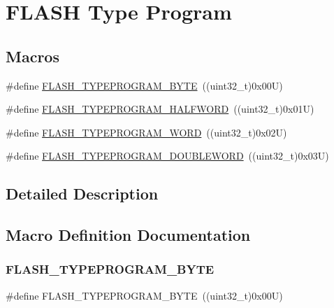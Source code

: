 \hypertarget{group___f_l_a_s_h___type___program}{}\section{F\+L\+A\+SH Type Program}
\label{group___f_l_a_s_h___type___program}
\subsection*{Macros}
\begin{DoxyCompactItemize}
\item 
\#define \mbox{\hyperlink{group___f_l_a_s_h___type___program_gac975d7139325057ed0069c6b55e4faed}{F\+L\+A\+S\+H\+\_\+\+T\+Y\+P\+E\+P\+R\+O\+G\+R\+A\+M\+\_\+\+B\+Y\+TE}}~((uint32\+\_\+t)0x00\+U)
\item 
\#define \mbox{\hyperlink{group___f_l_a_s_h___type___program_ga2b607dfc2efd463a8530e327bc755582}{F\+L\+A\+S\+H\+\_\+\+T\+Y\+P\+E\+P\+R\+O\+G\+R\+A\+M\+\_\+\+H\+A\+L\+F\+W\+O\+RD}}~((uint32\+\_\+t)0x01\+U)
\item 
\#define \mbox{\hyperlink{group___f_l_a_s_h___type___program_gadd25c6821539030ba6711e7c0d586c3e}{F\+L\+A\+S\+H\+\_\+\+T\+Y\+P\+E\+P\+R\+O\+G\+R\+A\+M\+\_\+\+W\+O\+RD}}~((uint32\+\_\+t)0x02\+U)
\item 
\#define \mbox{\hyperlink{group___f_l_a_s_h___type___program_gabdc2b0b4d2e66c2be90fafbfbf1e225f}{F\+L\+A\+S\+H\+\_\+\+T\+Y\+P\+E\+P\+R\+O\+G\+R\+A\+M\+\_\+\+D\+O\+U\+B\+L\+E\+W\+O\+RD}}~((uint32\+\_\+t)0x03\+U)
\end{DoxyCompactItemize}


\subsection{Detailed Description}


\subsection{Macro Definition Documentation}
\mbox{\label{group___f_l_a_s_h___type___program_gac975d7139325057ed0069c6b55e4faed}} 
\subsubsection{\texorpdfstring{FLASH\_TYPEPROGRAM\_BYTE}{FLASH\_TYPEPROGRAM\_BYTE}}
{\footnotesize\ttfamily \#define F\+L\+A\+S\+H\+\_\+\+T\+Y\+P\+E\+P\+R\+O\+G\+R\+A\+M\+\_\+\+B\+Y\+TE~((uint32\+\_\+t)0x00\+U)}

